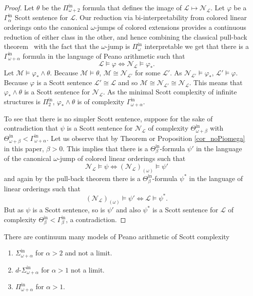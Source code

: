 \documentclass[11pt]{amsart}
\newcommand{\N}{\mathcal{N}}
\newcommand{\mc}[1]{\mathcal{#1}}
\newcommand{\Pinf}[1]{\Pi^{\mathrm{in}}_{#1}}
\newcommand{\Sinf}[1]{\Sigma^{\mathrm{in}}_{#1}}
\newcommand{\dSinf}[1]{d\text{-}\Sigma^{\mathrm{in}}_{#1}}
\def\N{{\mathcal N}}
\theoremstyle{remark}
\begin{document}
\begin{proof}
    Let $\theta$ be the $\Pinf{\omega+2}$ formula that defines the image of $\mc{L}\mapsto\mc{N}_\mc{L}$.
		Let $\varphi$ be a $\Gamma^{\mathrm{in}}_\alpha$ Scott sentence for $\mc{L}$.
		Our reduction via bi-interpretability from colored linear orderings onto the canonical $\omega$-jumps of colored extensions provides a continuous reduction of either class in the other, and hence combining the classical pull-back theorem~\cite[Theorem XI.7]{MBook} with the fact that the $\omega$-jump is $\Pinf{\omega}$ interpretable we get that there is a $\Gamma^{\mathrm{in}}_{\omega+\alpha}$ formula in the language of Peano arithmetic such that
    \[\mc{L}\models\varphi \iff \mc{N}_\mc{L}\models\varphi_*.\]
    Let $\mc{M}\models\varphi_*\land\theta$.
    Because $\mc{M}\models\theta$, $\mc{M}\cong\mc{N}_{\mc{L}'}$ for some $\mc{L}'$.
    As $\mc{N}_{\mc{L}'}\models \varphi_*$, $\mc{L}'\models \varphi$.
    Because $\varphi$ is a Scott sentence $\mc{L}'\cong\mc{L}$ and so $\mc{M}\cong \mc{N}_{\mc{L}'}\cong \mc{N}_{\mc{L}}$.
    This means that $\varphi_*\land\theta$ is a Scott sentence for $\mc{N}_\mc{L}$.
		As the minimal Scott complexity of infinite structures is $\Pinf{2}$, $\varphi_*\land\theta$ is of complexity $\Gamma^{\mathrm{in}}_{\omega+\alpha}$.

		To see that there is no simpler Scott sentence, suppose for the sake of contradiction that $\psi$ is a Scott sentence for $\mc{N}_\mc{L}$ of complexity $\Theta^{\mathrm{in}}_{\omega+\beta}$ with $\Theta_{\omega+\beta}^{\mathrm{in}}<\Gamma^{\mathrm{in}}_{\omega+\alpha}$. Let us observe that by Theorem \cite[Theorem 8]{MR23} or Proposition \ref{cor_noPiomega} in this paper, $\beta>0$. This implies that there is a $\Theta^{\mathrm{in}}_\beta$-formula $\psi'$ in the language of the canonical $\omega$-jump of colored linear orderings such that 
		\[ \N_\mc{L} \models \psi\iff (\N_\mc{L})_{(\omega)}\models \psi'\]
	and again by the pull-back theorem there is a $\Theta^{\mathrm{in}}_\beta$-formula $\psi^*$ in the language of linear orderings such that 
	\[ (\N_\mc{L})_{(\omega)}\models \psi'\iff \mc{L}\models \psi^*.\]
	But as $\psi$ is a Scott sentence, so is $\psi'$ and also $\psi^*$ is a Scott sentence for $\mc{L}$ of complexity $\Theta^{\mathrm{in}}_\beta<\Gamma^{\mathrm{in}}_\beta$, a contradiction.
\end{proof}

\begin{theorem}\label{thm:transferedcomplexities}
    There are continuum many models of Peano arithmetic of Scott complexity 
    \begin{enumerate}
        \item $\Sinf{\omega+\alpha}$ for $\alpha>2$ and not a limit.
        \item $\dSinf{\omega+\alpha}$ for $\alpha>1$ not a limit.
        \item $\Pinf{\omega+\alpha}$ for $\alpha>1$.
    \end{enumerate}
    
\end{theorem}
\end{document}
